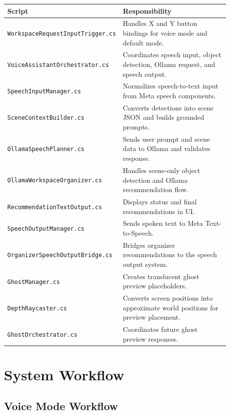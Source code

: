 \documentclass[12pt,a4paper]{article}
\begin{document}
\begin{longtable}{p{0.32\linewidth} p{0.58\linewidth}}
\toprule
\textbf{Script} & \textbf{Responsibility}\\
\midrule
\texttt{WorkspaceRequestInputTrigger.cs} & Handles X and Y button bindings for voice mode and default mode.\\
\texttt{VoiceAssistantOrchestrator.cs} & Coordinates speech input, object detection, Ollama request, and speech output.\\
\texttt{SpeechInputManager.cs} & Normalizes speech-to-text input from Meta speech components.\\
\texttt{SceneContextBuilder.cs} & Converts detections into scene JSON and builds grounded prompts.\\
\texttt{OllamaSpeechPlanner.cs} & Sends user prompt and scene data to Ollama and validates response.\\
\texttt{OllamaWorkspaceOrganizer.cs} & Handles scene-only object detection and Ollama recommendation flow.\\
\texttt{RecommendationTextOutput.cs} & Displays status and final recommendations in UI.\\
\texttt{SpeechOutputManager.cs} & Sends spoken text to Meta Text-to-Speech.\\
\texttt{OrganizerSpeechOutputBridge.cs} & Bridges organizer recommendations to the speech output system.\\
\texttt{GhostManager.cs} & Creates translucent ghost preview placeholders.\\
\texttt{DepthRaycaster.cs} & Converts screen positions into approximate world positions for preview placement.\\
\texttt{GhostOrchestrator.cs} & Coordinates future ghost preview responses.\\
\bottomrule
\end{longtable}

\section{System Workflow}

\subsection{Voice Mode Workflow}
\end{document}
